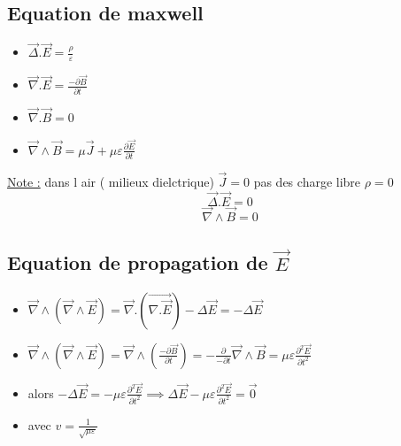 \documentclass[12pt]{book}
\begin{document}
            \subsection{Equation de maxwell}
                \begin{itemize}
                    \item $\vec{\Delta}.\vec{E} = \frac{\rho}{\varepsilon}$
                    \item $\vec{\nabla}.\vec{E} = \frac{-\partial \vec{B}}{\partial t}$
                    \item $\vec{\nabla}.\vec{B} = 0 $
                    \item $\vec{\nabla}\wedge\vec{B} = \mu \vec{J} + \mu \varepsilon \frac{\partial\vec{E}}{\partial t} $
                \end{itemize}
                \underline{Note :} dans l air ( milieux dielctrique) $\vec{J} =0 $ pas des charge libre $ \rho =0 $ 
                    \[ \vec{\Delta}.\vec{E} =0\]
                    \[ \vec{\nabla}\wedge\vec{B} =0\]
            \subsection{Equation de propagation de $\vec{E}$}
                \begin{itemize}
                    \item $\vec{\nabla}\wedge(\vec{\nabla}\wedge\vec{E}) =\vec{\nabla}.(\vec{\nabla.\vec{E}}) - \Delta\vec{E} = -\Delta\vec{E}$
                    \item $\vec{\nabla}\wedge(\vec{\nabla}\wedge\vec{E}) = \vec{\nabla}\wedge(\frac{-\partial\vec{B}}{\partial t})= - \frac{\partial}{-\partial t} \vec{\nabla}\wedge\vec{B} =\mu\varepsilon\frac{\partial^2\vec{E}}{\partial t^2}$
                    \item alors $-\Delta\vec{E} = -\mu\varepsilon\frac{\partial^2\vec{E}}{\partial t^2} \implies \Delta\vec{E} -\mu\varepsilon\frac{\partial^2\vec{E}}{\partial t^2} =\vec{0}$
                    \item \begin{center}
                        avec $ v= \frac{1}{\sqrt{\mu\varepsilon}}$
                        \end{center}
                \end{itemize}
\end{document}
